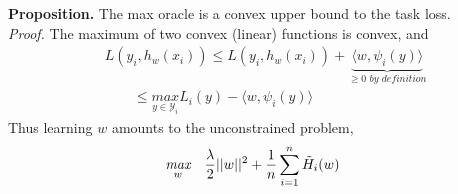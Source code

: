 \textbf{Proposition.} The max oracle is a convex upper bound to the task loss.\\
\textit{Proof.} The maximum of two convex (linear) functions is convex, and
\begin{equation*}
\begin{aligned}
    &L(y_{i},h_{w}(x_{i})) \leq L(y_{i},h_{w}(x_{i})) + \underbrace{\langle w, \psi_{i}(y)\rangle}_{\geq 0 \textit{ by definition}} \\
    &\quad\quad\leq \underset{y\in\mathcal{Y}_{i}}{\textit{max}} L_{i}(y)- \langle w, \psi_{i}(y)\rangle
\end{aligned}
\end{equation*}
Thus learning $w$ amounts to the unconstrained problem,
\begin{equation*}
\begin{aligned}
    &\underset{w}{\textit{max}}\quad\frac{\lambda}{2}||w||^{2}+ \frac{1}{n}\sum_{i=1}^{n}\Tilde{H}_{i}(w)
\end{aligned}
\end{equation*}

